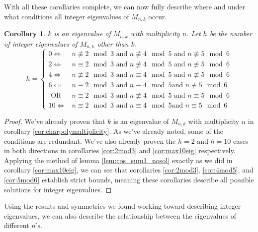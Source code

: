 \documentclass[12pt]{article}
\newtheorem{corollary}{Corollary}
\begin{document}
	With all these corollaries complete, we can now fully describe where and under
	what conditions all integer eigenvalues of $M_{n,k}$ occur.
	\begin{corollary}\label{cor:allint_eigvals}
		$k$ is an eigenvalue of $M_{n,k}$ with multiplicity $n$.
		Let $h$ be the number of integer eigenvalues of $M_{n,k}$ other than $k$.
		\begin{equation*}
		h = \begin{cases}
		0  \Leftrightarrow& n \not\equiv 2 \mod 3 \text{ and } n \not\equiv 4 \mod 5
		\text{ and } n \not\equiv 5 \mod 6  \\
		2  \Leftrightarrow& n \equiv 2 \mod 3 \text{ and } n \not\equiv 4 \mod 5
		\text{ and } n \not\equiv 5 \mod 6 \\
		4  \Leftrightarrow& n \not\equiv 2 \mod 3 \text{ and } n \equiv 4 \mod 5
		\text{ and } n \not\equiv 5 \mod 6  \\
		6  \Leftrightarrow& n \equiv 2 \mod 3 \text{ and } n \equiv 4 \mod 5 \text{
			and } n \not\equiv 5 \mod 6 \\
		\text{ OR }& n \equiv 2 \mod 3 \text{ and } n \not\equiv 4 \mod 5 \text{ and
		} n \equiv 5 \mod 6 \\
		10 \Leftrightarrow& n \equiv 2 \mod 3 \text{ and } n \equiv 4 \mod 5 \text{
			and } n \equiv 5 \mod 6
		\end{cases}
		\end{equation*}
	\end{corollary}
	\begin{proof}
		We've already proven that $k$ is an eigenvalue of $M_{n,k}$ with multiplicity
		$n$ in corollary \ref{cor:charpolymultiplicity}.
		As we've already noted, some of the conditions are redundant.
		We've also already proven the $h=2$ and $h=10$ cases in both directions in
		corollaries \ref{cor:2mod3} and \ref{cor:max10eig} respectively.
		Applying the method of lemma \ref{lem:cos_sum1_nosol} exactly as we did in
		corollary \ref{cor:max10eig}, we can see that corollaries \ref{cor:2mod3},
		\ref{cor:4mod5}, and \ref{cor:5mod6} establish strict bounds, meaning these
		corollaries describe all possible solutions for integer eigenvalues.
	\end{proof}
	
	Using the results and symmetries we found working toward describing integer
	eigenvalues, we can also describe the relationship between the eigenvalues of
	different $n$'s.
	
\end{document}
